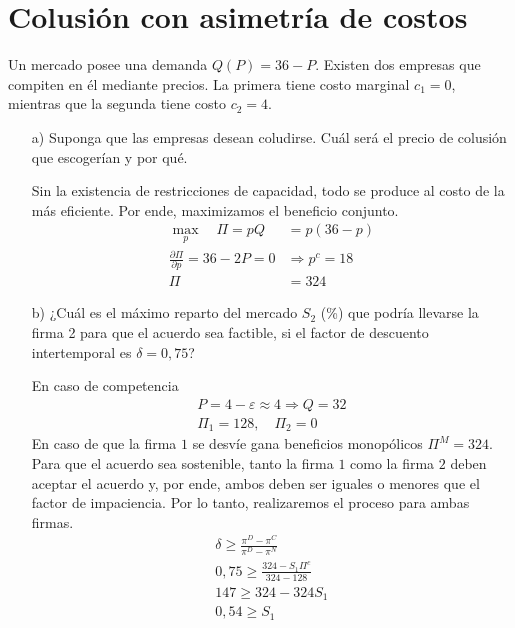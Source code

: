 \section{Colusión con asimetría de costos}
\renewcommand{\thefootnote}{\Roman{footnote}}
Un mercado posee una demanda $Q(P)=36-P$. Existen dos empresas que compiten en él mediante precios. La primera tiene costo marginal $c_{1}=0$, mientras que la segunda tiene costo $c_{2}=4$.

\begin{itemize}
    \item[a)] Suponga que las empresas desean coludirse. Cuál será el precio de colusión que escogerían y por qué.
    \begin{solution}
        Sin la existencia de restricciones de capacidad, todo se produce al costo de la más eficiente. Por ende, maximizamos el beneficio conjunto.
        \begin{align*}
            \max_p \quad \Pi = pQ &= p(36-p) \\
            \frac{\partial \Pi}{\partial p}= 36 - 2 P = 0 &\Longrightarrow p^c = 18 \\
            \Pi &= 324
        \end{align*}
    \end{solution}
    \item[b)] ¿Cuál es el máximo reparto del mercado $S_{2}$ (\%) que podría llevarse la firma 2 para que el acuerdo sea factible, si el factor de descuento intertemporal es $\delta=0,75$?
    \begin{solution}
        En caso de competencia
        \begin{align*}
            P=4-\varepsilon \approx 4  \Longrightarrow Q=32 \\ 
            \Pi_{1}=128, \quad \Pi_{2}=0
        \end{align*}
        En caso de que la firma $1$ se desvíe gana beneficios monopólicos $\Pi^M = 324$. Para que el acuerdo sea sostenible, tanto la firma $1$ como la firma $2$ deben aceptar el acuerdo y, por ende, ambos deben ser iguales o menores que el factor de impaciencia. Por lo tanto, realizaremos el proceso para ambas firmas.
        \begin{align*}
            \delta \geq \frac{\pi^{D}-\pi^{C}}{\pi^{D}-\pi^{N}} \\
            0,75 \geq \frac{324-S_{1} \Pi^{c}}{324-128} \\
            147 \geq 324 - 324S_1 \\
            0,54\geq S_1

\end{align*}
\end{solution}
\end{itemize}

